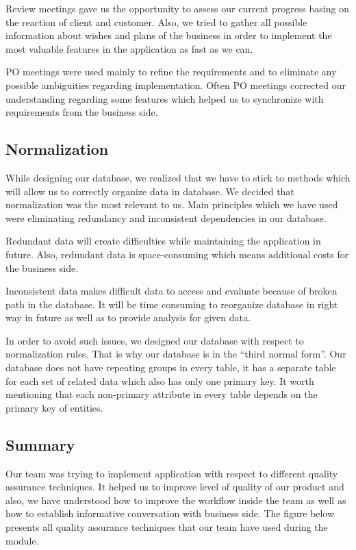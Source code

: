 Review meetings gave us the opportunity to assess our current progress basing on the reaction of client and customer. Also, we tried to gather all possible information about wishes and plans of the business in order to implement the most valuable features in the application as fast as we can.

PO meetings were used mainly to refine the requirements and to eliminate any possible ambiguities regarding implementation. Often PO meetings corrected our understanding regarding some features which helped us to synchronize with requirements from the business side.

\subsection{Normalization}
While designing our database, we realized that we have to stick to methods which will allow us to correctly organize data in database. We decided that normalization was the most relevant to us. Main principles which we have used were eliminating redundancy and inconsistent dependencies in our database.

Redundant data will create difficulties while maintaining the application in future. Also, redundant data is space-consuming which means additional costs for the business side. 

Inconsistent data makes difficult data to access and evaluate because of broken path in the database. It will be time consuming to reorganize database in right way in future as well as to provide analysis for given data.

In order to avoid such issues, we designed our database with respect to normalization rules. That is why our database is in the “third normal form”. Our database does not have repeating groups in every table, it has a separate table for each set of related data which also has only one primary key. It worth mentioning that each non-primary attribute in every table depends on the primary key of entities. 

\subsection{Summary}
Our team was trying to implement application with respect to different quality assurance techniques. It helped us to improve level of quality of our product and also, we have understood how to improve the workflow inside the team as well as how to establish informative conversation with business side. The figure below presents all quality assurance techniques that our team have used during the module.

